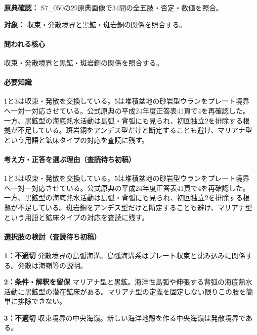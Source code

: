 \noindent\textbf{原典確認：} S7\_050の29原典画像で34問の全五肢・否定・数値を照合。\par

\noindent\textbf{対象：} 収束・発散境界と黒鉱・斑岩銅の関係を照合する。\par

\paragraph{問われる核心} 収束・発散境界と黒鉱・斑岩銅の関係を照合する。

\paragraph{必要知識} 1と3は収束・発散を交換している。5は堆積盆地の砂岩型ウランをプレート境界へ一対一対応させている。公式原典の平成24年度正答表41頁で4を再確認した。一方、黒鉱型の海底熱水活動は島弧・背弧にも見られ、初回独立2を排除する根拠が不足している。斑岩銅をアンデス型だけと断定することも避け、マリアナ型という用語と鉱床タイプの対応を査読に残す。

\paragraph{考え方・正答を選ぶ理由（査読待ち初稿）} 1と3は収束・発散を交換している。5は堆積盆地の砂岩型ウランをプレート境界へ一対一対応させている。公式原典の平成24年度正答表41頁で4を再確認した。一方、黒鉱型の海底熱水活動は島弧・背弧にも見られ、初回独立2を排除する根拠が不足している。斑岩銅をアンデス型だけと断定することも避け、マリアナ型という用語と鉱床タイプの対応を査読に残す。

\paragraph{選択肢の検討（査読待ち初稿）}\mbox{}\par

\noindent\textbf{1：不適切} 発散境界の島弧海溝。島弧海溝系はプレート収束と沈み込みに関係する。発散は海嶺等の説明。\par

\noindent\textbf{2：条件・解釈を留保} マリアナ型と黒鉱。海洋性島弧や伸張する背弧の海底熱水活動に黒鉱型の潜在鉱床がある。マリアナ型の定義を固定しない限りこの肢を簡単に排除できない。\par

\noindent\textbf{3：不適切} 収束境界の中央海嶺。新しい海洋地殻を作る中央海嶺は発散境界である。\par

